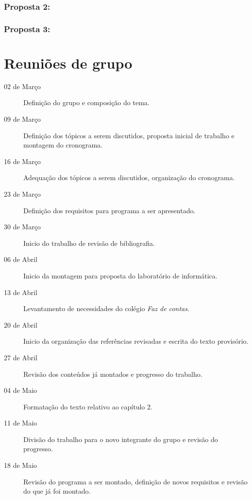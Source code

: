 \documentclass[a4paper,12pt]{report}
\begin{document}
            \subsection{Proposta 2:}

            \subsection{Proposta 3:}

    \appendix

    \chapter{Reuniões de grupo}

    \begin{description}

        \item[02 de Março] Definição do grupo e composição do tema.

        \item[09 de Março] Definição dos tópicos a serem discutidos, proposta
        inicial de trabalho e montagem do cronograma.

        \item[16 de Março] Adequação dos tópicos a serem discutidos, organização
        do cronograma.

        \item[23 de Março] Definição dos requisitos para programa a ser
        apresentado.

        \item[30 de Março] Inicio do trabalho de revisão de bibliografia.

        \item[06 de Abril] Inicio da montagem para proposta do laboratório de
        informática.

        \item[13 de Abril] Levantamento de necessidades do colégio \emph{Faz de
        contas}.

        \item[20 de Abril] Inicio da organização das referências revisadas e
        escrita do texto provisório.

        \item[27 de Abril] Revisão dos conteúdos já montados e progresso do
        trabalho.

        \item[04 de Maio] Formatação do texto relativo ao capítulo 2.

        \item[11 de Maio] Divisão do trabalho para o novo integrante do grupo e
        revisão do progresso.

        \item[18 de Maio] Revisão do programa a ser montado, definição de novos
        requisitos e revisão do que já foi montado.

    \end{description}
\end{document}
